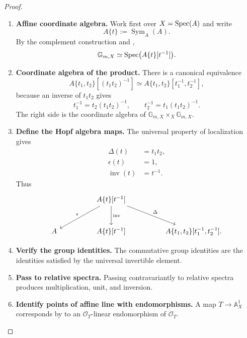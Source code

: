 \begin{proof}
\leavevmode
\begin{enumerate}[label=\textup{(\arabic*)}]
    \item \textbf{Affine coordinate algebra.}
    Work first over \(X=\operatorname{Spec}(A)\) and write
    \[
        A\{t\}:=\operatorname{Sym}_A(A).
    \]
    By the complement construction and
    ,
    \[
        \mathbb G_{m,X}
        \simeq
        \operatorname{Spec}\bigl(A\{t\}[t^{-1}]\bigr).
    \]

    \item \textbf{Coordinate algebra of the product.}
    There is a canonical equivalence
    \[
        A\{t_1,t_2\}[(t_1t_2)^{-1}]
        \simeq
        A\{t_1,t_2\}[t_1^{-1},t_2^{-1}],
    \]
    because an inverse of \(t_1t_2\) gives
    \[
        t_1^{-1}=t_2(t_1t_2)^{-1},
        \qquad
        t_2^{-1}=t_1(t_1t_2)^{-1}.
    \]
    The right side is the coordinate algebra of
    \(\mathbb G_{m,X}\times_X\mathbb G_{m,X}\).

    \item \textbf{Define the Hopf algebra maps.}
    The universal property of localization gives
    \[
    \begin{aligned}
        \Delta(t)&=t_1t_2,\\
        \epsilon(t)&=1,\\
        \operatorname{inv}(t)&=t^{-1}.
    \end{aligned}
    \]
    Thus
    \[
    \begin{tikzcd}[column sep=huge, row sep=large]
        &
        A\{t\}[t^{-1}]
            \arrow[dl, "\epsilon"']
            \arrow[d, "\operatorname{inv}"]
            \arrow[dr, "\Delta"]
        &
        \\
        A
        &
        A\{t\}[t^{-1}]
        &
        A\{t_1,t_2\}[t_1^{-1},t_2^{-1}].
    \end{tikzcd}
    \]

    \item \textbf{Verify the group identities.}
    The commutative group identities are the identities satisfied by the
    universal invertible element.

    \item \textbf{Pass to relative spectra.}
    Passing contravariantly to relative spectra
    produces multiplication, unit, and inversion.

    \item \textbf{Identify points of affine line with endomorphisms.}
    A map \(T\to\mathbb A_X^1\) corresponds by
     to an
    \(\mathcal O_T\)-linear endomorphism of \(\mathcal O_T\).


\end{enumerate}
\end{proof}
